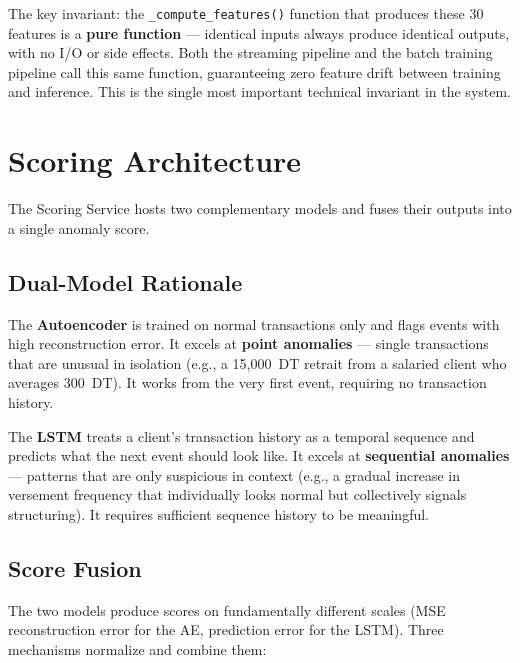 The key invariant: the \texttt{\_compute\_features()} function that produces these
30 features is a \textbf{pure function} --- identical inputs always produce identical
outputs, with no I/O or side effects. Both the streaming pipeline and the batch
training pipeline call this same function, guaranteeing zero feature drift between
training and inference. This is the single most important technical invariant in the
system.

\section{Scoring Architecture}

The Scoring Service hosts two complementary models and fuses their outputs into a
single anomaly score.

\subsection{Dual-Model Rationale}

The \textbf{Autoencoder} is trained on normal transactions only and flags events with
high reconstruction error. It excels at \textbf{point anomalies} --- single
transactions that are unusual in isolation (e.g., a 15,000~DT retrait from a salaried
client who averages 300~DT). It works from the very first event, requiring no
transaction history.

The \textbf{LSTM} treats a client's transaction history as a temporal sequence and
predicts what the next event should look like. It excels at \textbf{sequential
anomalies} --- patterns that are only suspicious in context (e.g., a gradual increase
in versement frequency that individually looks normal but collectively signals
structuring). It requires sufficient sequence history to be meaningful.

\subsection{Score Fusion}

The two models produce scores on fundamentally different scales (MSE reconstruction
error for the AE, prediction error for the LSTM). Three mechanisms normalize and
combine them:

